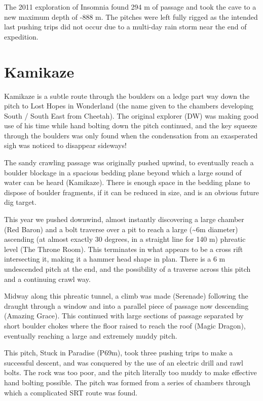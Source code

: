 The 2011 exploration of Insomnia found 294 m of passage and took the
cave to a new maximum depth of -888 m. The pitches were left fully
rigged as the intended last pushing trips did not occur due to a
multi-day rain storm near the end of expedition.

\section{Kamikaze}\label{kamikaze}

Kamikaze is a subtle route through the boulders on a ledge part way down
the pitch to Lost Hopes in Wonderland (the name given to the chambers
developing South / South East from Cheetah). The original explorer (DW)
was making good use of his time while hand bolting down the pitch
continued, and the key squeeze through the boulders was only found when
the condensation from an exasperated sigh was noticed to disappear
sideways!

The sandy crawling passage was originally pushed upwind, to eventually
reach a boulder blockage in a spacious bedding plane beyond which a
large sound of water can be heard (Kamikaze). There is enough space in
the bedding plane to dispose of boulder fragments, if it can be reduced
in size, and is an obvious future dig target.

This year we pushed downwind, almost instantly discovering a large
chamber (Red Baron) and a bolt traverse over a pit to reach a large
(\textasciitilde{}6m diameter) ascending (at almost exactly 30 degrees,
in a straight line for 140 m) phreatic level (The Throne Room). This
terminates in what appears to be a cross rift intersecting it, making it
a hammer head shape in plan. There is a 6 m undescended pitch at the
end, and the possibility of a traverse across this pitch and a
continuing crawl way.

Midway along this phreatic tunnel, a climb was made (Serenade) following
the draught through a window and into a parallel piece of passage now
descending (Amazing Grace). This continued with large sections of
passage separated by short boulder chokes where the floor raised to
reach the roof (Magic Dragon), eventually reaching a large and extremely
muddy pitch.

This pitch, Stuck in Paradise (P69m), took three pushing trips to make a
successful descent, and was conquered by the use of an electric drill
and rawl bolts. The rock was too poor, and the pitch literally too muddy
to make effective hand bolting possible. The pitch was formed from a
series of chambers through which a complicated SRT route was found.

